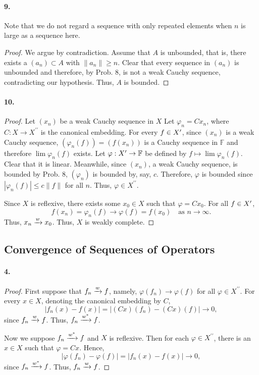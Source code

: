   \paragraph{9.}
    Note that we do not regard a sequence with only repeated elements when $n$
    is large as a sequence here.
  \begin{proof}
    We argue by contradiction. Assume that $A$ is unbounded, that is, there 
    exists a $(a_n)\subset A$ with $\|a_n\|\ge n$. Clear that every sequence in
     $(a_n)$ is unbounded and therefore, by Prob. 8, is not a weak Cauchy 
     sequence, contradicting our hypothesis. Thus, $A$ is bounded.
  \end{proof}
  
  \paragraph{10.}
  \begin{proof}
    Let $(x_n)$ be a weak Cauchy sequence in $X$ Let $\varphi_n=Cx_n$, where $C:
    X\to X^{\prime\prime}$ is the canonical embedding. For every $f\in X^\prime$,
    since $(x_n)$ is a weak Cauchy sequence, $(\varphi_n(f))=(f(x_n))$ is a 
    Cauchy sequence in $\mathbb{F}$ and therefore $\lim\varphi_n(f)$ exists. Let
    $\varphi:X^\prime\to\mathbb{F}$ be defined by $f\mapsto \lim\varphi_n(f)$. Clear
    that it is linear. Meanwhile, since $(x_n)$, a weak Cauchy sequence, is
    bounded by Prob. 8, $(\varphi_n)$ is bounded by, say, $c$. Therefore, 
    $\varphi$ is bounded since $|\varphi_n(f)|\le c\|f\|$ for all $n$. Thus, 
    $\varphi\in X^{\prime\prime}$. \par
    Since $X$ is reflexive, there exists some $x_0\in X$ such that $\varphi=
    Cx_0$. For all $f\in X^\prime$,
    \[
      f(x_n)=\varphi_n(f) \to \varphi(f) = f(x_0)\quad\text{as $n\to\infty$}.
    \]
    Thus, $x_n\xrightarrow{w} x_0$. Thus, $X$ is weakly complete.
  \end{proof}
\subsection{Convergence of Sequences of Operators}
  \paragraph{4.}
  \begin{proof}
    First suppose that $f_n\xrightarrow{w} f$, namely, $\varphi(f_n)\to\varphi(f)$ for all
    $\varphi\in X^{\prime\prime}$. For every $x\in X$, denoting the canonical
    embedding by $C$, 
    \[
      |f_n(x)-f(x)|=|(Cx)(f_n)-(Cx)(f)|\to 0,
    \]
    since $f_n\xrightarrow{w} f$. Thus, $f_n\xrightarrow{w^*} f$.\par
    Now we suppose $f_n\xrightarrow{w^*} f$ and $X$ is reflexive. Then for each $\varphi\in 
    X^{\prime\prime}$, there is an $x\in X$ such that $\varphi=Cx$. Hence,
    \[
      |\varphi(f_n)-\varphi(f)|=|f_n(x)-f(x)|\to 0,
    \]
    since $f_n\xrightarrow{w^*} f$. Thus, $f_n\xrightarrow{w} f$.
  \end{proof}
  
